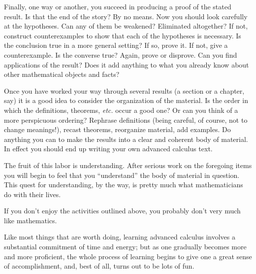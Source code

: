 Finally, one way or another, you succeed in producing a proof of the stated result.  Is
that the end of the story?  By no means. Now you should look carefully at the hypotheses.
Can any of them be weakened?  Eliminated altogether?  If not, construct counterexamples
to show that each of the hypotheses is necessary. Is the conclusion true in a more
general setting?  If so, prove it. If not, give a counterexample.  Is the converse true?
Again, prove or disprove.  Can you find applications of the result?  Does it add anything
to what you already know about other mathematical objects and facts?

Once you have worked your way through several results (a section or a chapter, say) it is a
good idea to consider the organization of the material.  Is the order in which the
definitions, theorems, \emph{etc.} occur a good one?  Or can you think of a more perspicuous
ordering?  Rephrase definitions (being careful, of course, not to change meanings!), recast
theorems, reorganize material, add examples.  Do anything you can to make the results into a
clear and coherent body of material.  In effect you should end up writing your own advanced
calculus text.

The fruit of this labor is understanding. After serious work on the foregoing items you will
begin to feel that you ``understand'' the body of material in question.  This quest for
understanding, by the way, is pretty much what mathematicians do with their lives.

If you don't enjoy the activities outlined above, you probably don't very much like
mathematics.

Like most things that are worth doing, learning advanced calculus involves a substantial
commitment of time and energy; but as one gradually becomes more and more proficient, the
whole process of learning begins to give one a great sense of accomplishment, and, best of
all, turns out to be lots of fun.


\endinput
